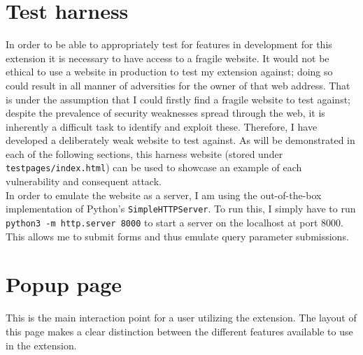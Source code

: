 \section{Test harness}

In order to be able to appropriately test for features in development for this extension it is necessary to have access to a fragile website. It would not be ethical to use a website in production to test my extension against; doing so could result in all manner of adversities for the owner of that web address. That is under the assumption that I could firstly find a fragile website to test against; despite the prevalence of security weaknesses spread through the web, it is inherently a difficult task to identify and exploit these. Therefore, I have developed a deliberately weak website to test against. As will be demonstrated in each of the following sections, this harness website (stored under \texttt{testpages/index.html}) can be used to showcase an example of each vulnerability and consequent attack. \\

In order to emulate the website as a server, I am using the out-of-the-box implementation of Python's \texttt{SimpleHTTPServer}. To run this, I simply have to run \texttt{python3 -m http.server 8000} to start a server on the localhost at port 8000. This allows me to submit forms and thus emulate query parameter submissions.

\section{Popup page}

This is the main interaction point for a user utilizing the extension. The layout of this page makes a clear distinction between the different features available to use in the extension. \\

